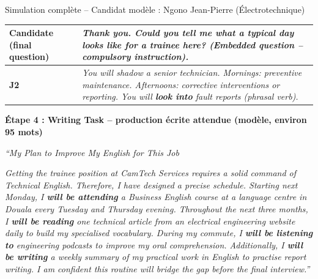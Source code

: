 \documentclass[11pt]{article}
\newcommand{\cle}[1]{{\popxbold\color{popdark}#1}}
\begin{document}
\begin{exoresolu}{Simulation complète -- Candidat modèle : Ngono Jean-Pierre (Électrotechnique)}
\begin{center}
\begin{tabularx}{\linewidth}{|l|X|}
\textbf{Candidate (final question)} & \emph{Thank you. \textbf{Could you tell me what a typical day} looks like for a trainee here? (\cle{Embedded question} -- compulsory instruction).} \\ \hline
\textbf{J2} & \emph{You will shadow a senior technician. Mornings: preventive maintenance. Afternoons: corrective interventions or reporting. You will \textbf{look into} fault reports (\cle{phrasal verb}).} \\ \hline
\end{tabularx}
\end{center}

\textbf{Étape 4 : Writing Task -- production écrite attendue (modèle, environ 95 mots)}

\emph{``My Plan to Improve My English for This Job}

\emph{Getting the trainee position at CamTech Services requires a solid command of Technical English. Therefore, I have designed a precise schedule. Starting next Monday, I \textbf{will be attending} a Business English course at a language centre in Douala every Tuesday and Thursday evening. Throughout the next three months, I \textbf{will be reading} one technical article from an electrical engineering website daily to build my specialised vocabulary. During my commute, I \textbf{will be listening to} engineering podcasts to improve my oral comprehension. Additionally, I \textbf{will be writing} a weekly summary of my practical work in English to practise report writing. I am confident this routine will bridge the gap before the final interview.''}


\end{exoresolu}
\end{document}
